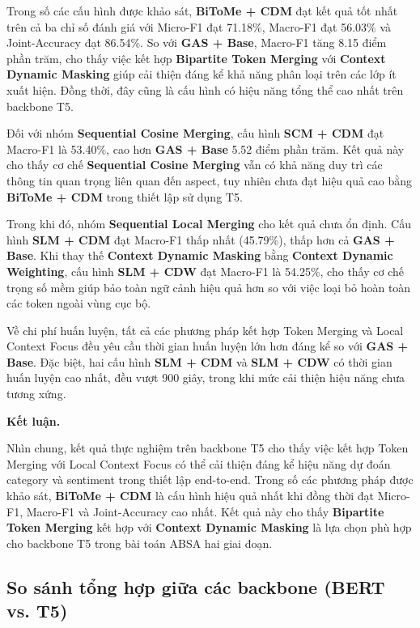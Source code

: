 Trong số các cấu hình được khảo sát, \textbf{BiToMe + CDM} đạt kết quả tốt nhất trên cả ba chỉ số đánh giá với Micro-F1 đạt 71.18\%, Macro-F1 đạt 56.03\% và Joint-Accuracy đạt 86.54\%. So với \textbf{GAS + Base}, Macro-F1 tăng 8.15 điểm phần trăm, cho thấy việc kết hợp \textbf{Bipartite Token Merging} với \textbf{Context Dynamic Masking} giúp cải thiện đáng kể khả năng phân loại trên các lớp ít xuất hiện. Đồng thời, đây cũng là cấu hình có hiệu năng tổng thể cao nhất trên backbone T5.

Đối với nhóm \textbf{Sequential Cosine Merging}, cấu hình \textbf{SCM + CDM} đạt Macro-F1 là 53.40\%, cao hơn \textbf{GAS + Base} 5.52 điểm phần trăm. Kết quả này cho thấy cơ chế \textbf{Sequential Cosine Merging} vẫn có khả năng duy trì các thông tin quan trọng liên quan đến aspect, tuy nhiên chưa đạt hiệu quả cao bằng \textbf{BiToMe + CDM} trong thiết lập sử dụng T5.

Trong khi đó, nhóm \textbf{Sequential Local Merging} cho kết quả chưa ổn định. Cấu hình \textbf{SLM + CDM} đạt Macro-F1 thấp nhất (45.79\%), thấp hơn cả \textbf{GAS + Base}. Khi thay thế \textbf{Context Dynamic Masking} bằng \textbf{Context Dynamic Weighting}, cấu hình \textbf{SLM + CDW} đạt Macro-F1 là 54.25\%, cho thấy cơ chế trọng số mềm giúp bảo toàn ngữ cảnh hiệu quả hơn so với việc loại bỏ hoàn toàn các token ngoài vùng cục bộ.

Về chi phí huấn luyện, tất cả các phương pháp kết hợp Token Merging và Local Context Focus đều yêu cầu thời gian huấn luyện lớn hơn đáng kể so với \textbf{GAS + Base}. Đặc biệt, hai cấu hình \textbf{SLM + CDM} và \textbf{SLM + CDW} có thời gian huấn luyện cao nhất, đều vượt 900 giây, trong khi mức cải thiện hiệu năng chưa tương xứng.

\textbf{Kết luận.}

Nhìn chung, kết quả thực nghiệm trên backbone T5 cho thấy việc kết hợp Token Merging với Local Context Focus có thể cải thiện đáng kể hiệu năng dự đoán category và sentiment trong thiết lập end-to-end. Trong số các phương pháp được khảo sát, \textbf{BiToMe + CDM} là cấu hình hiệu quả nhất khi đồng thời đạt Micro-F1, Macro-F1 và Joint-Accuracy cao nhất. Kết quả này cho thấy \textbf{Bipartite Token Merging} kết hợp với \textbf{Context Dynamic Masking} là lựa chọn phù hợp cho backbone T5 trong bài toán ABSA hai giai đoạn.

\subsection*{So sánh tổng hợp giữa các backbone (BERT vs. T5)}

